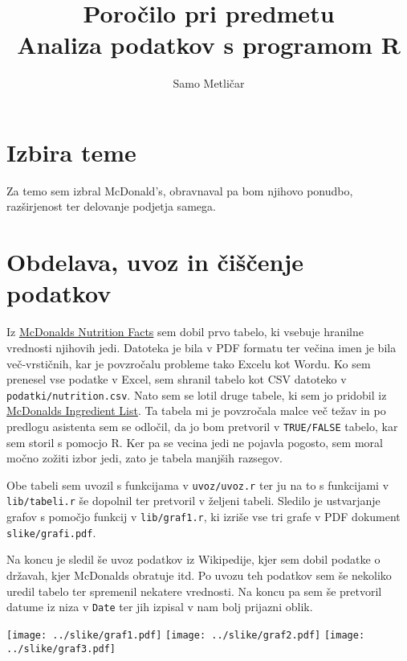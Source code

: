 \documentclass[11pt,a4paper]{article}
\begin{document}
\title{Poročilo pri predmetu \\
Analiza podatkov s programom R}
\author{Samo Metličar}
\maketitle

\section{Izbira teme}

Za temo sem izbral McDonald's, obravnaval pa bom njihovo ponudbo, raz\-šir\-je\-nost ter delovanje podjetja samega.

\section{Obdelava, uvoz in čiščenje podatkov}

Iz \href{http://nutrition.mcdonalds.com/getnutrition/nutritionfacts.pdf}{McDonalds Nutrition Facts} sem dobil prvo tabelo, ki vsebuje hranilne vrednosti njihovih jedi. Datoteka je bila v PDF formatu ter večina imen je bila več-vrstičnih, kar je povzročalu probleme tako Excelu kot Wordu. Ko sem prenesel vse podatke v Excel, sem shranil tabelo kot CSV datoteko v \verb|podatki/nutrition.csv|. Nato sem se lotil druge tabele, ki sem jo pridobil iz \href{http://nutrition.mcdonalds.com/getnutrition/ingredientslist.pdf}{McDonalds Ingredient List}. Ta tabela mi je povzročala malce več težav in po predlogu asistenta sem se odločil, da jo bom pretvoril v \verb|TRUE/FALSE| tabelo, kar sem storil s pomocjo R. Ker pa se vecina jedi ne pojavla pogosto, sem moral močno zožiti izbor jedi, zato je tabela manjših razsegov. \par

Obe tabeli sem uvozil s funkcijama v \verb|uvoz/uvoz.r| ter ju na to s funkcijami v \verb|lib/tabeli.r| še dopolnil ter pretvoril v željeni tabeli. Sledilo je ustvarjanje grafov s pomočjo funkcij v \verb|lib/graf1.r|, ki izriše vse tri grafe v PDF dokument \verb|slike/grafi.pdf|. \par

Na koncu je sledil še uvoz podatkov iz Wikipedije, kjer sem dobil podatke o državah, kjer McDonalds obratuje itd. Po uvozu teh podatkov sem še nekoliko uredil tabelo ter spremenil nekatere vrednosti. Na koncu pa sem še pretvoril datume iz niza v \verb|Date| ter jih izpisal v nam bolj prijazni oblik.

\texttt{[image: ../slike/graf1.pdf]}
\texttt{[image: ../slike/graf2.pdf]}
\texttt{[image: ../slike/graf3.pdf]}
\end{document}
